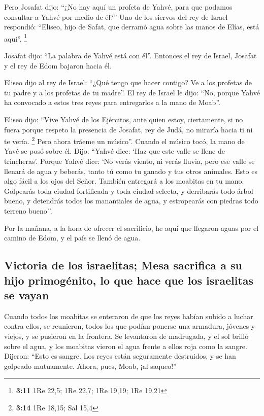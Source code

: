 Pero Josafat dijo: ``¿No hay aquí un profeta de Yahvé,
para que podamos consultar a Yahvé por medio de él?'' Uno de los siervos
del rey de Israel respondió: ``Eliseo, hijo de Safat, que derramó agua
sobre las manos de Elías, está aquí''. \footnote{\textbf{3:11} 1Re 22,5;
  1Re 22,7; 1Re 19,19; 1Re 19,21}

 Josafat dijo: ``La palabra de Yahvé está con él''.
Entonces el rey de Israel, Josafat y el rey de Edom bajaron hacia él.

 Eliseo dijo al rey de Israel: ``¿Qué tengo que hacer
contigo? Ve a los profetas de tu padre y a los profetas de tu madre''.
El rey de Israel le dijo: ``No, porque Yahvé ha convocado a estos tres
reyes para entregarlos a la mano de Moab''.

 Eliseo dijo: ``Vive Yahvé de los Ejércitos, ante quien
estoy, ciertamente, si no fuera porque respeto la presencia de Josafat,
rey de Judá, no miraría hacia ti ni te vería. \footnote{\textbf{3:14}
  1Re 18,15; Sal 15,4}  Pero ahora tráeme un músico''.
Cuando el músico tocó, la mano de Yavé se posó sobre él. 
Dijo: ``Yahvé dice: `Haz que este valle se llene de trincheras'.
 Porque Yahvé dice: `No verás viento, ni verás lluvia,
pero ese valle se llenará de agua y beberás, tanto tú como tu ganado y
tus otros animales.  Esto es algo fácil a los ojos del
Señor. También entregará a los moabitas en tu mano. 
Golpearás toda ciudad fortificada y toda ciudad selecta, y derribarás
todo árbol bueno, y detendrás todos los manantiales de agua, y
estropearás con piedras todo terreno bueno''.

 Por la mañana, a la hora de ofrecer el sacrificio, he
aquí que llegaron aguas por el camino de Edom, y el país se llenó de
agua.

\hypertarget{victoria-de-los-israelitas-mesa-sacrifica-a-su-hijo-primoguxe9nito-lo-que-hace-que-los-israelitas-se-vayan}{%
\subsection{Victoria de los israelitas; Mesa sacrifica a su hijo
primogénito, lo que hace que los israelitas se
vayan}\label{victoria-de-los-israelitas-mesa-sacrifica-a-su-hijo-primoguxe9nito-lo-que-hace-que-los-israelitas-se-vayan}}

 Cuando todos los moabitas se enteraron de que los reyes
habían subido a luchar contra ellos, se reunieron, todos los que podían
ponerse una armadura, jóvenes y viejos, y se pusieron en la frontera.
 Se levantaron de madrugada, y el sol brilló sobre el
agua, y los moabitas vieron el agua frente a ellos roja como la sangre.
 Dijeron: ``Esto es sangre. Los reyes están seguramente
destruidos, y se han golpeado mutuamente. Ahora, pues, Moab, ¡al
saqueo!''

